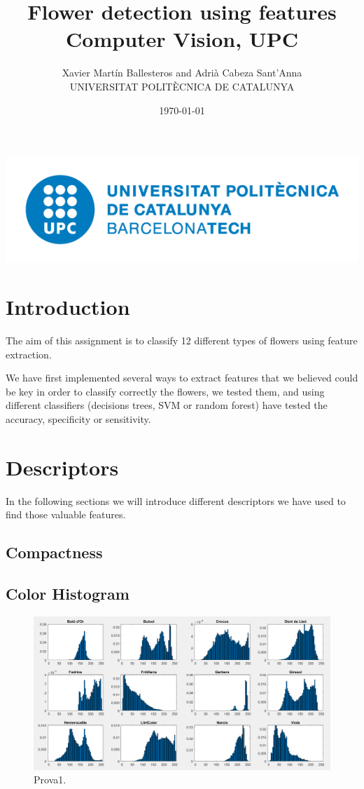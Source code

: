 \documentclass[11]{article}
\author{Xavier Martín Ballesteros and Adrià Cabeza Sant'Anna \\ \small UNIVERSITAT POLITÈCNICA DE CATALUNYA}
\title{Flower detection using features\\ \large{Computer Vision, UPC}}
\date{\today}
\begin{document}
\maketitle
\vspace*{\fill}
\includegraphics[scale=0.4]{UPClogo.png}\par\vspace{1cm}

\newpage
\tableofcontents
\newpage 

\section{Introduction}
The aim of this assignment is to classify 12 different types of flowers using feature extraction. 

We have first implemented several ways to extract features that we believed could be key in order to classify correctly the flowers, we tested them, and using different classifiers (decisions trees, SVM or random forest) have tested the accuracy, specificity or sensitivity. 

\section{Descriptors}
In the following sections we will introduce different descriptors we have used to find those valuable features.

\subsection{Compactness}
\subsection{Color Histogram}

\begin{figure}[H]
	\centering
	\includegraphics[scale=0.35]{images/colorHistogram1}
	\caption{Prova1.}
\end{figure}
\end{document}
